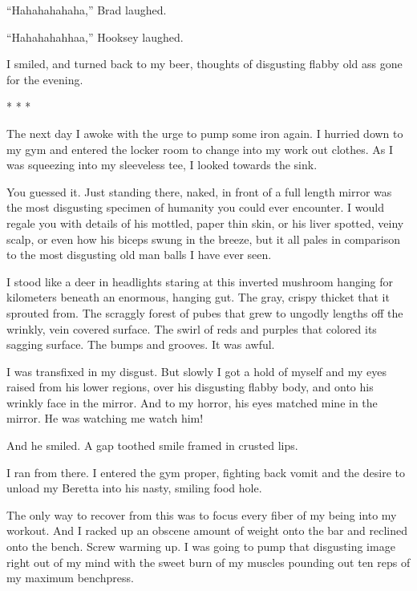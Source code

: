 ``Hahahahahaha,'' Brad laughed.

``Hahahahahhaa,'' Hooksey laughed.



I smiled, and turned back to my beer, thoughts of disgusting flabby
old ass gone for the evening.



* * *




The next day I awoke with the urge to pump some iron again. I
hurried down to my gym and entered the locker room to change into
my work out clothes. As I was squeezing into my sleeveless tee, I
looked towards the sink.



You guessed it. Just standing there, naked, in front of a full
length mirror was the most disgusting specimen of humanity you
could ever encounter. I would regale you with details of his
mottled, paper thin skin, or his liver spotted, veiny scalp, or
even how his biceps swung in the breeze, but it all pales in
comparison to the most disgusting old man balls I have ever
seen.



I stood like a deer in headlights staring at this inverted mushroom
hanging for kilometers beneath an enormous, hanging gut. The gray,
crispy thicket that it sprouted from. The scraggly forest of pubes
that grew to ungodly lengths off the wrinkly, vein covered surface.
The swirl of reds and purples that colored its sagging surface. The
bumps and grooves. It was awful.



I was transfixed in my disgust. But slowly I got a hold of myself
and my eyes raised from his lower regions, over his disgusting
flabby body, and onto his wrinkly face in the mirror. And to my
horror, his eyes matched mine in the mirror. He was watching me
watch him!



And he smiled. A gap toothed smile framed in crusted lips.



I ran from there. I entered the gym proper, fighting back vomit and
the desire to unload my Beretta into his nasty, smiling food
hole.



The only way to recover from this was to focus every fiber of my
being into my workout. And I racked up an obscene amount of weight
onto the bar and reclined onto the bench. Screw warming up. I was
going to pump that disgusting image right out of my mind with the
sweet burn of my muscles pounding out ten reps of my maximum
benchpress.



